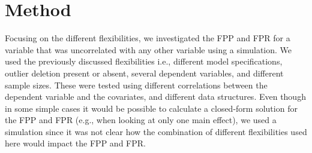 \section{Method}
Focusing on the different flexibilities, we investigated the FPP and FPR for a variable that was uncorrelated with any other variable using a simulation. We used the previously discussed flexibilities i.e., different model specifications, outlier deletion present or absent, several dependent variables, and different sample sizes. These were tested using different correlations between the dependent variable and the covariates, and different data structures. Even though in some simple cases it would be possible to calculate a closed-form solution for the FPP and FPR (e.g., when looking at only one main effect), we used a simulation since it was not clear how the combination of different flexibilities used here would impact the FPP and FPR.\\

